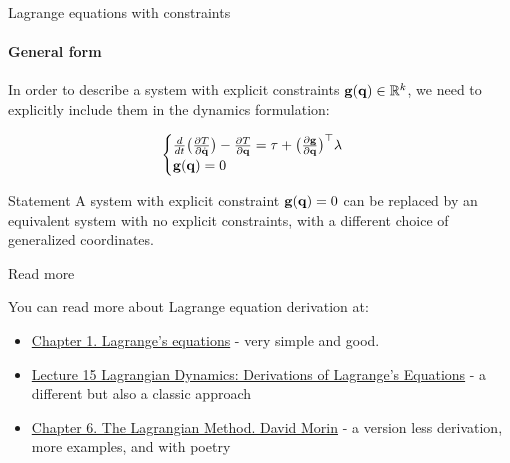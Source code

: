 \documentclass{beamer}
\begin{document}
\begin{frame}{Lagrange equations with constraints}
\framesubtitle{General form}
\begin{flushleft}

In order to describe a system with explicit constraints $\mathbf{g}(\mathbf{q}) \in \mathbb{R}^k$, we need to explicitly include them in the dynamics formulation:

\begin{equation}
\begin{cases}
    \frac{d}{dt} \big( 
    \frac{\partial T }{\partial \dot{\mathbf{q}}}
    \big) - 
    \frac{\partial T }{\partial \mathbf{q}} = \tau + 
    \big( \frac{\partial \mathbf{g} }{\partial \mathbf{q}} \big) ^\top
    \lambda \\
    \mathbf{g}(\mathbf{q}) = 0
\end{cases}
\end{equation}

\begin{block}{Statement}
A system with explicit constraint $\mathbf{g}(\mathbf{q}) = 0$ can be replaced by an equivalent system with no explicit constraints, with a different choice of generalized coordinates.
\end{block}

\end{flushleft}
\end{frame}




\begin{frame}{Read more}
\begin{flushleft}

You can read more about Lagrange equation derivation at:

\begin{itemize}
    \item \href{http://kestrel.nmt.edu/~raymond/classes/ph321/notes/lagrange/lagrange.pdf}{Chapter 1. Lagrange’s equations} - very simple and good.
    \item \href{https://ocw.mit.edu/courses/mechanical-engineering/2-003j-dynamics-and-control-i-spring-2007/lecture-notes/lec15.pdf}{Lecture 15 Lagrangian Dynamics: Derivations of Lagrange’s Equations} - a different but also a classic approach
    \item \href{https://scholar.harvard.edu/files/david-morin/files/cmchap6.pdf}{Chapter 6. The Lagrangian Method. David Morin} - a version less derivation, more examples, and with poetry
\end{itemize}

\end{flushleft}
\end{frame}
\end{document}
